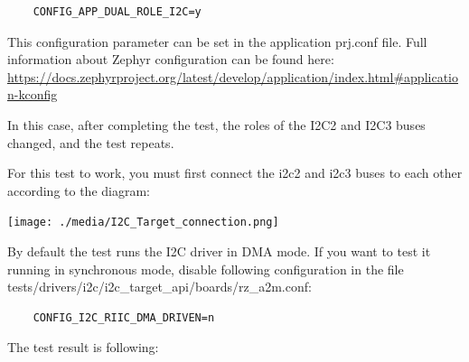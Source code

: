 \documentclass[11pt,a4paper,oneside]{article}
\begin{document}
\begin{lstlisting}
	CONFIG_APP_DUAL_ROLE_I2C=y
\end{lstlisting}
\label{prj.conf} This configuration parameter can be set in the application prj.conf file.
Full information about Zephyr configuration can be found here:
\url{https://docs.zephyrproject.org/latest/develop/application/index.html#application-kconfig}

In this case, after completing the test, the roles of the I2C2 and I2C3 buses changed, and the test repeats.

For this test to work, you must first connect the i2c2 and i2c3 buses to each other
according to the diagram:

\texttt{[image: ./media/I2C\_Target\_connection.png]}

By default the test runs the I2C driver in DMA mode. If you want to test it running in synchronous mode, disable following configuration in the file tests/drivers/i2c/i2c\_target\_api/boards/rz\_a2m.conf:

\begin{lstlisting}
	CONFIG_I2C_RIIC_DMA_DRIVEN=n
\end{lstlisting}

The test result is following:
\end{document}
